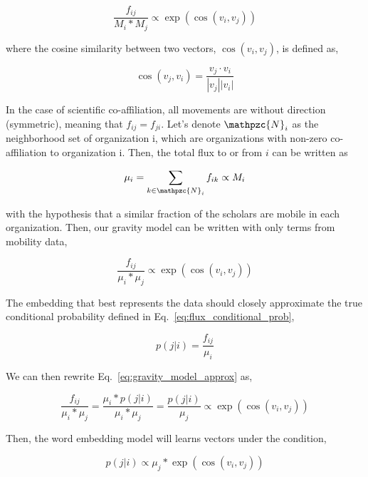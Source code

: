 \documentclass[12pt]{article} %
\begin{document}
\begin{equation}
    \label{eq:gravity_model}
    \frac{f_{ij}}{M_{i} * M_{j}} \propto \exp(\cos(v_i,v_j))
\end{equation}

where the cosine similarity between two vectors, $\cos(v_{i}, v_{j})$, is defined as,

\begin{equation}
    \cos(v_j, v_i) = \frac{v_j \cdot v_i}{|v_j||v_i|} 
\end{equation}

In the case of scientific co-affiliation, all movements are without direction (symmetric), meaning that  $f_{ij} = f_{ji}$.
Let's denote $\mathpzc{N}_i$ as the neighborhood set of organization i, which are organizations with non-zero co-affiliation to organization i.
Then, the total flux to or from $i$ can be written as 

\begin{equation}
    \mu_{i} = \sum_{k\in\mathpzc{N}_i} f_{ik} \propto M_i
\end{equation} 

with the hypothesis that a similar fraction of the scholars are mobile in each organization. Then, our gravity model can be written with only terms from mobility data, 

\begin{equation}
    \label{eq:gravity_model_approx}
    \frac{f_{ij}}{\mu_i * \mu_j} \propto \exp(\cos(v_i,v_j))
\end{equation}

The embedding that best represents the data should closely approximate the true conditional probability defined in
Eq.~\ref{eq:flux_conditional_prob},

\begin{equation}
    \label{eq:flux_conditional_prob}
    p(j|i) = \frac{f_{ij}}{\mu_i} 
\end{equation}

We can then rewrite Eq.~\ref{eq:gravity_model_approx} as, 

\begin{equation}
    \label{eq:gravity_relationship}
    \frac{f_{ij}}{\mu_i * \mu_j} = \frac{\mu_i * p(j|i)}{\mu_i * \mu_j} =  \frac{p(j|i)}{\mu_j} \propto \exp(\cos(v_i,v_j))
\end{equation}

Then, the word embedding model will learns vectors under the condition,

\begin{equation}
    \label{eq:conditional probability}
      p(j|i) \propto {\mu_j}* \exp(\cos(v_i,v_j))
\end{equation}
\end{document}
